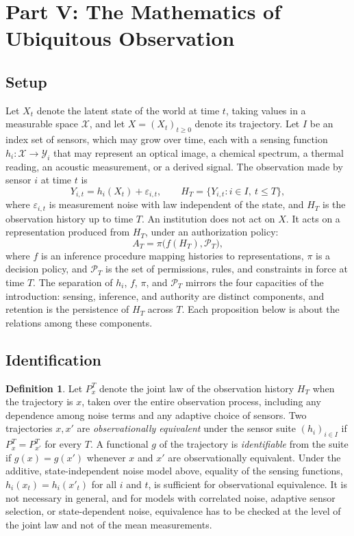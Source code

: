 \documentclass[11pt]{article}
\theoremstyle{plain}
\theoremstyle{definition}
\newtheorem{definition}{Definition}
\theoremstyle{remark}
\begin{document}
\section{Part V: The Mathematics of Ubiquitous Observation}

\subsection{Setup}

Let $X_t$ denote the latent state of the world at time $t$, taking values in a measurable space $\mathcal{X}$, and let $X=(X_t)_{t\geq 0}$ denote its trajectory. Let $I$ be an index set of sensors, which may grow over time, each with a sensing function $h_i:\mathcal{X}\to\mathcal{Y}_i$ that may represent an optical image, a chemical spectrum, a thermal reading, an acoustic measurement, or a derived signal. The observation made by sensor $i$ at time $t$ is
\[
Y_{i,t}=h_i(X_t)+\varepsilon_{i,t},
\qquad
H_T=\{Y_{i,t}: i\in I,\ t\leq T\},
\]
where $\varepsilon_{i,t}$ is measurement noise with law independent of the state, and $H_T$ is the observation history up to time $T$. An institution does not act on $X$. It acts on a representation produced from $H_T$, under an authorization policy:
\[
A_T=\pi\bigl(f(H_T),\mathcal{P}_T\bigr),
\]
where $f$ is an inference procedure mapping histories to representations, $\pi$ is a decision policy, and $\mathcal{P}_T$ is the set of permissions, rules, and constraints in force at time $T$. The separation of $h_i$, $f$, $\pi$, and $\mathcal{P}_T$ mirrors the four capacities of the introduction: sensing, inference, and authority are distinct components, and retention is the persistence of $H_T$ across $T$. Each proposition below is about the relations among these components.

\subsection{Identification}

\begin{definition}
Let $P_x^{T}$ denote the joint law of the observation history $H_T$ when the trajectory is $x$, taken over the entire observation process, including any dependence among noise terms and any adaptive choice of sensors. Two trajectories $x,x'$ are \emph{observationally equivalent} under the sensor suite $(h_i)_{i\in I}$ if $P_x^{T}=P_{x'}^{T}$ for every $T$. A functional $g$ of the trajectory is \emph{identifiable} from the suite if $g(x)=g(x')$ whenever $x$ and $x'$ are observationally equivalent. Under the additive, state-independent noise model above, equality of the sensing functions, $h_i(x_t)=h_i(x'_t)$ for all $i$ and $t$, is sufficient for observational equivalence. It is not necessary in general, and for models with correlated noise, adaptive sensor selection, or state-dependent noise, equivalence has to be checked at the level of the joint law and not of the mean measurements.
\end{definition}
\end{document}

